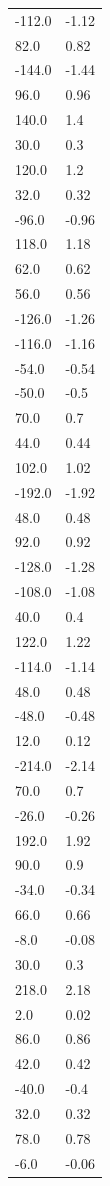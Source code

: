 \begin{longtable}{ll}
-112.0 & -1.12 \\
82.0 & 0.82 \\
-144.0 & -1.44 \\
96.0 & 0.96 \\
140.0 & 1.4 \\
30.0 & 0.3 \\
120.0 & 1.2 \\
32.0 & 0.32 \\
-96.0 & -0.96 \\
118.0 & 1.18 \\
62.0 & 0.62 \\
56.0 & 0.56 \\
-126.0 & -1.26 \\
-116.0 & -1.16 \\
-54.0 & -0.54 \\
-50.0 & -0.5 \\
70.0 & 0.7 \\
44.0 & 0.44 \\
102.0 & 1.02 \\
-192.0 & -1.92 \\
48.0 & 0.48 \\
92.0 & 0.92 \\
-128.0 & -1.28 \\
-108.0 & -1.08 \\
40.0 & 0.4 \\
122.0 & 1.22 \\
-114.0 & -1.14 \\
48.0 & 0.48 \\
-48.0 & -0.48 \\
12.0 & 0.12 \\
-214.0 & -2.14 \\
70.0 & 0.7 \\
-26.0 & -0.26 \\
192.0 & 1.92 \\
90.0 & 0.9 \\
-34.0 & -0.34 \\
66.0 & 0.66 \\
-8.0 & -0.08 \\
30.0 & 0.3 \\
218.0 & 2.18 \\
2.0 & 0.02 \\
86.0 & 0.86 \\
42.0 & 0.42 \\
-40.0 & -0.4 \\
32.0 & 0.32 \\
78.0 & 0.78 \\
-6.0 & -0.06 \\

\end{longtable}
